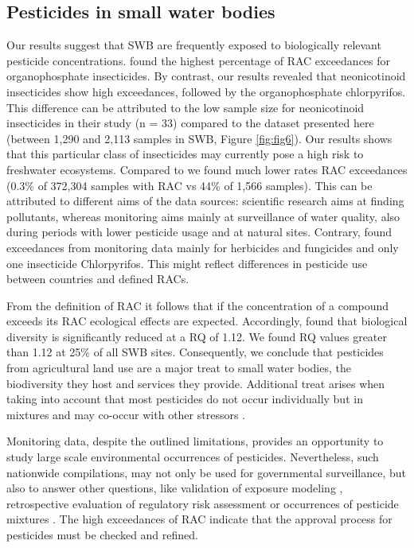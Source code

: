 \documentclass[journal=esthag,manuscript=article]{achemso}
\begin{document}
\subsection{Pesticides in small water bodies}
Our results suggest that SWB are frequently exposed to biologically relevant pesticide concentrations.
\citet{stehle_pesticide_2015} found the highest percentage of RAC exceedances for organophosphate insecticides. 
By contrast, our results revealed that neonicotinoid insecticides show high exceedances, followed by the organophosphate chlorpyrifos. 
This difference can be attributed to the low sample size for neonicotinoid insecticides in their study (n = 33) compared to the dataset presented here (between 1,290 and 2,113 samples in SWB, Figure \ref{fig:fig6}). 
Our results shows that this particular class of insecticides may currently pose a high risk to freshwater ecosystems.
Compared to \citet{stehle_pesticide_2015} we found much lower rates RAC exceedances (0.3\% of 372,304 samples with RAC vs 44\% of 1,566 samples). 
This can be attributed to different aims of the data sources: scientific research aims at finding pollutants, whereas monitoring aims mainly at surveillance of water quality, also during periods with lower pesticide usage and at natural sites. 
Contrary, \citet{knauer_pesticides_2016} found exceedances from monitoring data mainly for herbicides and fungicides and only one insecticide Chlorpyrifos.
This might reflect differences in pesticide use between countries and defined RACs.

From the definition of RAC it follows that if the concentration of a compound exceeds its RAC ecological effects are expected.
Accordingly, \citet{stehle_agricultural_2015} found that biological diversity is significantly reduced at a RQ of 1.12.
We found RQ values greater than 1.12 at 25\% of all SWB sites. 
Consequently, we conclude that pesticides from agricultural land use are a major treat to small water bodies, the biodiversity they host and services they provide. 
Additional treat arises when taking into account that most pesticides do not occur individually but in mixtures \cite{schreiner_pesticide_2016} and may co-occur with other stressors \citep{schafer_contribution_2016}.


Monitoring data, despite the outlined limitations, provides an opportunity to study large scale environmental occurrences of pesticides.
Nevertheless, such nationwide compilations, may not only be used for governmental surveillance, but also to answer other questions, like validation of exposure modeling \cite{knabel_fungicide_2014}, retrospective evaluation of regulatory risk assessment \citep{knauer_pesticides_2016,stehle_pesticide_2015}or occurrences of pesticide mixtures \cite{schreiner_pesticide_2016}. 
The high exceedances of RAC indicate that the approval process for pesticides must be checked and refined.
\end{document}
